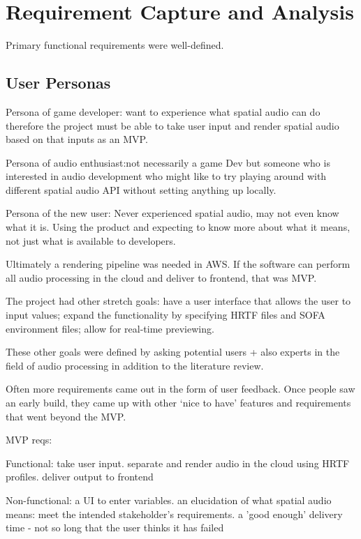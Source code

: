 \thispagestyle{plain}
\newpage
\section{Requirement Capture and Analysis}\label{sec:requirement-capture}

\normalsize

Primary functional requirements were well-defined.

\subsection{User Personas}

Persona of game developer:
want to experience what spatial audio can do therefore the project must be able
to take user input and render spatial audio based on that inputs as an MVP.

Persona of audio enthusiast:not necessarily a game Dev but someone who is interested in audio development who might like to try playing around with different spatial audio API without setting anything up locally.

Persona of the new user: Never experienced spatial audio, may not even know what it is.
Using the product and expecting to know more about what it means, not just what is available to developers.

Ultimately a rendering pipeline was needed in AWS. If the software can perform all audio processing in the cloud and deliver to frontend, that was MVP.

The project had other stretch goals: have a user interface that allows the user to input values; expand the functionality by specifying HRTF files and SOFA environment files; allow for real-time previewing.

These other goals were defined
by asking potential users + also experts in the field of audio processing in addition to the literature review.

Often more requirements came out in the form of user feedback.
Once people saw an early build, they came up with other `nice to have' features and requirements that went beyond the MVP\@.

MVP reqs:

Functional:
take user input.
separate and render audio in the cloud using HRTF profiles.
deliver output to frontend

Non-functional:
a UI to enter variables.
an elucidation of what spatial audio means: meet the intended stakeholder's requirements.
a 'good enough' delivery time - not so long that the user thinks it has failed


